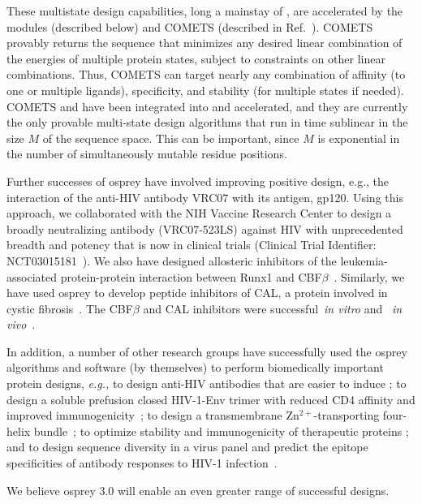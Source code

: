 These multistate design capabilities, long a mainstay of \osprey, are accelerated by the modules \bbks (described below) and COMETS (described in Ref.~).  COMETS provably returns the sequence that minimizes any desired linear combination of the energies of multiple protein states, subject to constraints on other linear combinations. Thus, COMETS can target nearly any combination of affinity (to one or multiple ligands), specificity, and stability (for multiple states if needed). COMETS and \bbks have been integrated into  and accelerated, and they are currently the only provable multi-state design algorithms that run in time sublinear in the size $M$ of the sequence space. This can be important, since $M$ is exponential in the number of simultaneously mutable residue positions.

Further successes of {\sc osprey} have involved improving positive design, e.g., the interaction of the anti-HIV antibody VRC07 with its antigen, gp120.  Using this approach, we collaborated with the NIH Vaccine Research Center to design a broadly neutralizing antibody (VRC07-523LS) against HIV with unprecedented breadth and potency that is now in clinical trials (Clinical Trial Identifier: NCT03015181~\cite{VRC07_enhance,clinical605}).  We also have designed allosteric inhibitors of the leukemia-associated protein-protein interaction between Runx1 and CBF$\beta$~\cite{runx1_cbfb}.  Similarly, we have used {\sc osprey} to develop peptide inhibitors of CAL, a protein involved in cystic fibrosis~\cite{CFTR}.  The CBF$\beta$ and CAL inhibitors were successful~\textit{in vitro} and ~\textit{in vivo}~\cite{runx1_cbfb,CFTR}.  

In addition, a number of other research groups have successfully used the {\sc osprey} algorithms and software (by themselves) to perform biomedically important protein designs, {\em e.g.,} to design anti-HIV antibodies that are easier to induce \cite{Georgiev:2014aa}; to design a soluble prefusion closed HIV-1-Env trimer with reduced CD4 affinity and improved immunogenicity~\cite{Gwo-yu17}; to design a transmembrane Zn$^{2+}$-transporting four-helix bundle~\cite{Joh14}; to optimize stability and immunogenicity of therapeutic proteins \cite{Parker:2013aa,Salvat:2015aa,Zhao:2015aa}; and to design sequence diversity in a virus panel and predict the epitope specificities of antibody responses to HIV-1 infection~\cite{polyclonal17}.

We believe {\sc osprey} 3.0 will enable an even greater range of successful designs.  

